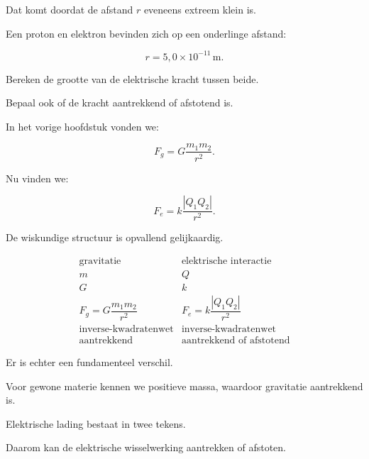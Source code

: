 \documentclass{ximera}
\begin{document}
Dat komt doordat de afstand $r$ eveneens extreem klein is.


\begin{oefening}{\oefB}

Een proton en elektron bevinden zich op een onderlinge afstand:

\[
r=5{,}0\times10^{-11}\,\mathrm m.
\]

Bereken de grootte van de elektrische kracht tussen beide.

Bepaal ook of de kracht aantrekkend of afstotend is.

\end{oefening}




In het vorige hoofdstuk vonden we:

\[
\boxed{
F_g
=
G\frac{m_1m_2}{r^2}.
}
\]

Nu vinden we:

\[
\boxed{
F_e
=
k\frac{|Q_1Q_2|}{r^2}.
}
\]

De wiskundige structuur is opvallend gelijkaardig.


\begin{center}
\[
\boxed{
\begin{array}{c|c}
\text{gravitatie} & \text{elektrische interactie}\\
\hline
m & Q\\[1mm]
G & k\\[1mm]
F_g=G\dfrac{m_1m_2}{r^2}
&
F_e=k\dfrac{|Q_1Q_2|}{r^2}\\[3mm]
\text{inverse-kwadratenwet}
&
\text{inverse-kwadratenwet}\\[1mm]
\text{aantrekkend}
&
\text{aantrekkend of afstotend}
\end{array}
}
\]
\end{center}


Er is echter een fundamenteel verschil.

Voor gewone materie kennen we positieve massa, waardoor gravitatie
aantrekkend is.

Elektrische lading bestaat in twee tekens.

Daarom kan de elektrische wisselwerking aantrekken of afstoten.


\end{document}
